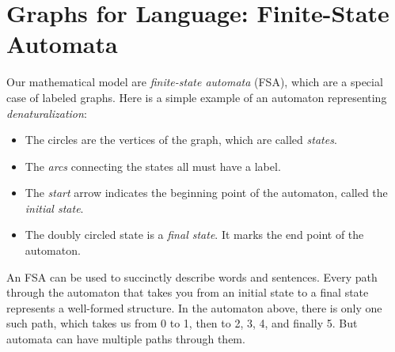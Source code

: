 \section{Graphs for Language: Finite-State Automata}

Our mathematical model are \emph{finite-state automata} (FSA), which are a special case of labeled graphs.
Here is a simple example of an automaton representing \emph{denaturalization}:
%
\begin{center}
\end{center}
%
\begin{itemize}
    \item The circles are the vertices of the graph, which are called \emph{states}.
    \item The \emph{arcs} connecting the states all must have a label.
    \item The \emph{start} arrow indicates the beginning point of the automaton, called the \emph{initial state}.
    \item The doubly circled state is a \emph{final state}.
        It marks the end point of the automaton.
\end{itemize}

An FSA can be used to succinctly describe words and sentences.
Every path through the automaton that takes you from an initial state to a final state represents a well-formed structure.
In the automaton above, there is only one such path, which takes us from 0 to 1, then to 2, 3, 4, and finally 5.
But automata can have multiple paths through them.

